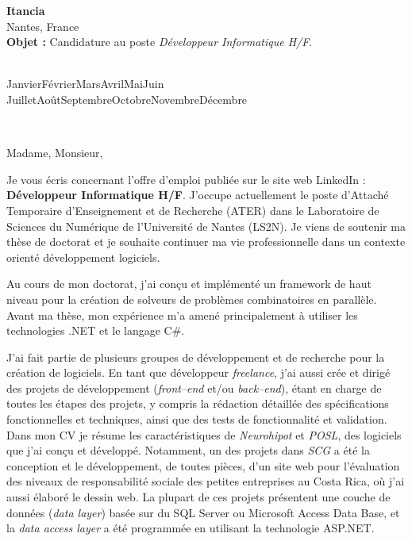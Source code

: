 \documentclass[11pt,a4paper]{letter} %
\def\today{\number\day\space\ifcase\month\or
  Janvier\or Février\or Mars\or Avril\or Mai\or Juin\or
  Juillet\or Août\or Septembre\or Octobre\or Novembre\or Décembre\fi
  \space\number\year}
\def\opening#1{\thispagestyle{empty}
{\centering\fromaddress \vspace{0.6in} \\ %
\hspace{6cm}\today\hspace*{\fill}\par} %
{\raggedright \toname \\ \toaddress \par} %
\vspace{0.4in} %
\noindent #1 %
}
\newcommand{\entreprise}{Itancia}
\newcommand{\poste}{Développeur Informatique H/F}
\newcommand{\where}{publiée sur le site web LinkedIn :~}
\newcommand{\intro}{Je vous écris concernant l'offre d'emploi \where 
\textbf{\poste}. 
J'occupe actuellement le poste d'Attaché Temporaire d'Enseignement et de Recherche (ATER) dans le Laboratoire de Sciences du Numérique de l'Université de Nantes (LS2N). Je viens de soutenir ma thèse de doctorat et je souhaite continuer ma vie professionnelle dans un contexte orienté développement logiciels.}
\begin{document}

\begin{letter}
{{\bf \entreprise}\\Nantes, France\\
\vspace{0.2in}
\textbf{Objet :} Candidature au poste \textit{\poste}.
}


\opening{Madame, Monsieur,}

\intro{}

Au cours de mon doctorat, j'ai con\c cu et implémenté un framework de haut niveau pour la création de solveurs de problèmes combinatoires en parallèle. %
Avant ma thèse, mon expérience m'a amené principalement à utiliser les technologies .NET et le langage C\#. %

J'ai fait partie de plusieurs groupes de développement et de recherche pour la création de logiciels. En tant que développeur \textit{freelance}, j'ai aussi crée et dirigé des projets de développement (\textit{front--end} et/ou \textit{back--end}), étant en charge de toutes les étapes des projets, y compris la rédaction détaillée des spécifications fonctionnelles et techniques, ainsi que des tests de fonctionnalité et validation.
Dans mon CV je résume les caractéristiques de \textit{Neurohipot} et \textit{POSL}, des logiciels que j'ai conçu et développé. Notamment, un des projets dans \textit{SCG} a été la conception et le développement, de toutes pièces, d'un site web pour l'évaluation des niveaux de responsabilité sociale des petites entreprises au Costa Rica, où j'ai aussi élaboré le dessin web.
La plupart de ces projets présentent une couche de données (\textit{data layer}) basée sur du SQL Server ou Microsoft Access Data Base, et la \textit{data access layer} a été programmée en utilisant la technologie ASP.NET.


\end{letter}
\end{document}
